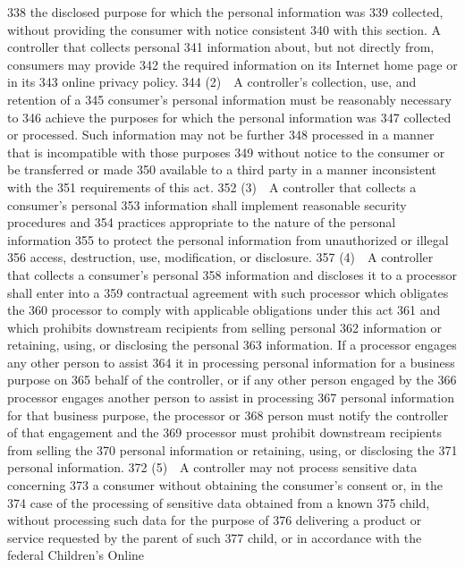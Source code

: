   338  the disclosed purpose for which the personal information was
  339  collected, without providing the consumer with notice consistent
  340  with this section. A controller that collects personal
  341  information about, but not directly from, consumers may provide
  342  the required information on its Internet home page or in its
  343  online privacy policy.
  344         (2) A controller’s collection, use, and retention of a
  345  consumer’s personal information must be reasonably necessary to
  346  achieve the purposes for which the personal information was
  347  collected or processed. Such information may not be further
  348  processed in a manner that is incompatible with those purposes
  349  without notice to the consumer or be transferred or made
  350  available to a third party in a manner inconsistent with the
  351  requirements of this act.
  352         (3) A controller that collects a consumer’s personal
  353  information shall implement reasonable security procedures and
  354  practices appropriate to the nature of the personal information
  355  to protect the personal information from unauthorized or illegal
  356  access, destruction, use, modification, or disclosure.
  357         (4) A controller that collects a consumer’s personal
  358  information and discloses it to a processor shall enter into a
  359  contractual agreement with such processor which obligates the
  360  processor to comply with applicable obligations under this act
  361  and which prohibits downstream recipients from selling personal
  362  information or retaining, using, or disclosing the personal
  363  information. If a processor engages any other person to assist
  364  it in processing personal information for a business purpose on
  365  behalf of the controller, or if any other person engaged by the
  366  processor engages another person to assist in processing
  367  personal information for that business purpose, the processor or
  368  person must notify the controller of that engagement and the
  369  processor must prohibit downstream recipients from selling the
  370  personal information or retaining, using, or disclosing the
  371  personal information.
  372         (5) A controller may not process sensitive data concerning
  373  a consumer without obtaining the consumer’s consent or, in the
  374  case of the processing of sensitive data obtained from a known
  375  child, without processing such data for the purpose of
  376  delivering a product or service requested by the parent of such
  377  child, or in accordance with the federal Children’s Online
